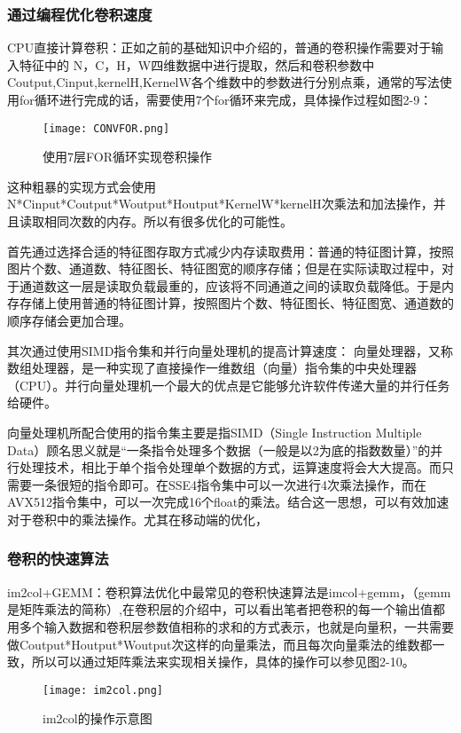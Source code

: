 \subsubsection{通过编程优化卷积速度}
CPU直接计算卷积：正如之前的基础知识中介绍的，普通的卷积操作需要对于输入特征中的 N，C，H，W四维数据中进行提取，然后和卷积参数中Coutput,Cinput,kernelH,KernelW各个维数中的参数进行分别点乘，通常的写法使用for循环进行完成的话，需要使用7个for循环来完成，具体操作过程如图2-9：
\begin{figure}[h]
\centering
\texttt{[image: CONVFOR.png]}
\caption{使用7层FOR循环实现卷积操作}
\end{figure}
这种粗暴的实现方式会使用N*Cinput*Coutput*Woutput*Houtput*KernelW*kernelH次乘法和加法操作，并且读取相同次数的内存。所以有很多优化的可能性。

首先通过选择合适的特征图存取方式减少内存读取费用：普通的特征图计算，按照图片个数、通道数、特征图长、特征图宽的顺序存储；但是在实际读取过程中，对于通道数这一层是读取负载最重的，应该将不同通道之间的读取负载降低。于是内存存储上使用普通的特征图计算，按照图片个数、特征图长、特征图宽、通道数的顺序存储会更加合理。

其次通过使用SIMD指令集和并行向量处理机的提高计算速度：
向量处理器，又称数组处理器，是一种实现了直接操作一维数组（向量）指令集的中央处理器（CPU）。并行向量处理机一个最大的优点是它能够允许软件传递大量的并行任务给硬件。

向量处理机所配合使用的指令集主要是指SIMD（Single Instruction Multiple Data）顾名思义就是“一条指令处理多个数据（一般是以2为底的指数数量）”的并行处理技术，相比于单个指令处理单个数据的方式，运算速度将会大大提高。而只需要一条很短的指令即可。在SSE4指令集中可以一次进行4次乘法操作，而在AVX512指令集中，可以一次完成16个float的乘法。结合这一思想，可以有效加速对于卷积中的乘法操作。尤其在移动端的优化，
\subsubsection{卷积的快速算法}
im2col+GEMM\cite{CAFFE}：卷积算法优化中最常见的卷积快速算法是imcol+gemm，（gemm是矩阵乘法的简称）,在卷积层的介绍中，可以看出笔者把卷积的每一个输出值都用多个输入数据和卷积层参数值相称的求和的方式表示，也就是向量积，一共需要做Coutput*Houtput*Woutput次这样的向量乘法，而且每次向量乘法的维数都一致，所以可以通过矩阵乘法来实现相关操作，具体的操作可以参见图2-10。
\begin{figure}[h]
 \centering
	\texttt{[image: im2col.png]}
	\caption{im2col的操作示意图}
\end{figure}

